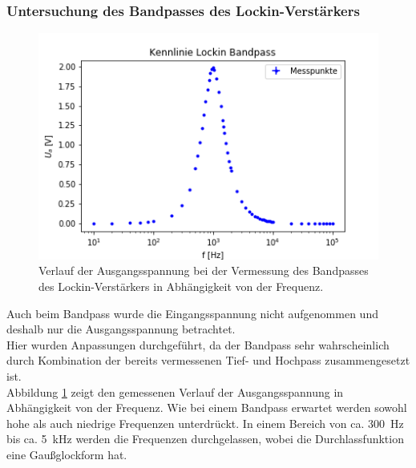 \documentclass[12pt,a4paper]{article}
\begin{document}
\subsubsection{Untersuchung des Bandpasses des Lockin-Verstärkers}

\begin{figure}
\centering
\includegraphics[scale=1]{Bilder/Vorversuch2/KennlinieBandpass.png}
\caption[test]{Verlauf der Ausgangsspannung bei der Vermessung des Bandpasses des Lockin-Verstärkers in Abhängigkeit von der Frequenz.}
\label{fig:LockinBandpass_Verlauf}
\end{figure}

Auch beim Bandpass wurde die Eingangsspannung nicht aufgenommen und deshalb nur die Ausgangsspannung betrachtet. \\
Hier wurden Anpassungen durchgeführt, da der Bandpass sehr wahrscheinlich durch Kombination der bereits vermessenen Tief- und Hochpass zusammengesetzt ist. \\
Abbildung \ref{fig:LockinBandpass_Verlauf} zeigt den gemessenen Verlauf der Ausgangsspannung in Abhängigkeit von der Frequenz. Wie bei einem Bandpass erwartet werden sowohl hohe als auch niedrige Frequenzen unterdrückt. In einem Bereich von ca. \SI{300}{Hz} bis ca. \SI{5}{kHz} werden die Frequenzen durchgelassen, wobei die Durchlassfunktion eine Gaußglockform hat.
\end{document}
